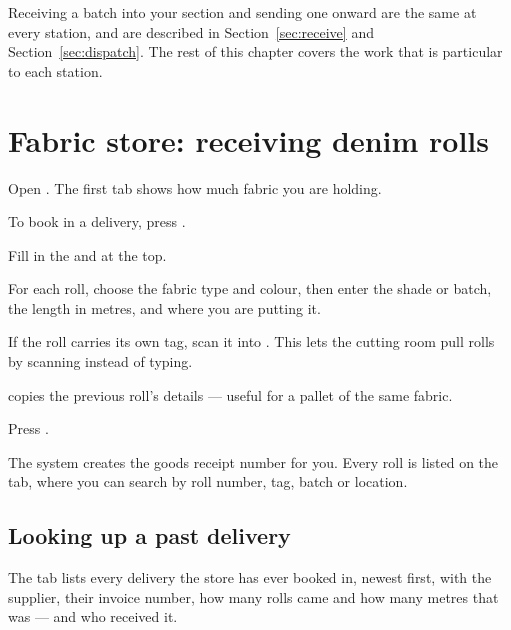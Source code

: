 Receiving a batch into your section and sending one onward are the same at
every station, and are described in Section~\ref{sec:receive} and
Section~\ref{sec:dispatch}. The rest of this chapter covers the work that is
particular to each station.

\section{Fabric store: receiving denim rolls}

Open . The first tab shows how much fabric you are holding.


To book in a delivery, press .


\begin{steps}
  \item Fill in the  and  at the top.
  \item For each roll, choose the fabric type and colour, then enter the shade
        or batch, the length in metres, and where you are putting it.
  \item If the roll carries its own tag, scan it into .
        This lets the cutting room pull rolls by scanning instead of typing.
  \item {} copies the previous roll's details --- useful for
        a pallet of the same fabric.
  \item Press .
\end{steps}

The system creates the goods receipt number for you. Every roll is listed on the
 tab, where you can search by roll number, tag, batch or
location.


\subsection{Looking up a past delivery}

The  tab lists every delivery the store has ever booked in,
newest first, with the supplier, their invoice number, how many rolls came and
how many metres that was --- and who received it.

